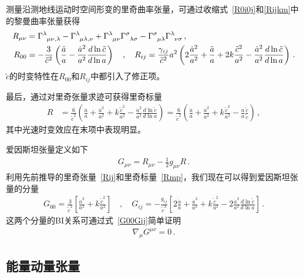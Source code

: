 \documentclass[jkps,preprint,fleqn]{revtex4}
\newcommand{\tc}{\tilde{c}}
\begin{document}
\begin{CJK*}{UTF8}{gbsn}
测量沿测地线运动时空间形变的里奇曲率张量，可通过收缩式~\eqref{R0i0j}和\eqref{Rijkm}中的黎曼曲率张量获得
\begin{align}
R_{\mu\nu} &= \tensor{\Gamma}{^\lambda_\mu_\nu_,_\lambda} - \tensor{\Gamma}{^\lambda_\mu_\lambda_,_\nu} + \tensor{\Gamma}{^\lambda_\mu_\nu} \tensor{\Gamma}{^\sigma_\lambda_\sigma} - \tensor{\Gamma}{^\sigma_\mu_\lambda} \tensor{\Gamma}{^\lambda_\nu_\sigma} \label{Rmn} \,, \\ R_{00} &= -\frac{3}{\tc^2} \left( \frac{\ddot{a}}{a} - \frac{\dot{a}^2}{a^2} \frac{d \ln \tc}{ d \ln a}  \right) \quad , \quad R_{ij} = \frac{\gamma_{ij}}{\tc^2} a^2 \left( 2 \frac{\dot{a}^2}{a^2} + \frac{\ddot{a}}{a} + 2 k \frac{\tc^2}{a^2} - \frac{\dot{a}^2}{a^2} \frac{d \ln \tc}{ d \ln a}  \right) \label{Rij} \,. \end{align}
$\tc$的时变特性在$R_{00}$和$R_{ij}$中都引入了修正项。

最后，通过对里奇张量求迹可获得里奇标量
\begin{align} R &= \frac{6}{\tc^2} \left( \frac{\ddot{a}}{a} + \frac{\dot{a}^2}{a^2} + k \frac{\tc^2}{a^2} - \frac{\dot{a}^2}{a^2} \frac{d \ln \tc}{ d \ln a}  \right) =  \frac{6}{\tc^2} \left( \frac{\ddot{a}}{a} + \frac{\dot{a}^2}{a^2} + k \frac{\tc^2}{a^2} - \frac{\dot{a}}{a} \frac{\dot{\tc}}{\tc}  \right)  \label{Rmp} \,, \end{align}
其中光速时变效应在末项中表现明显。

爱因斯坦张量定义如下
\begin{align}
G_{\mu\nu} = R_{\mu\nu} - \frac{1}{2} g_{\mu\nu} R \label{Gmunu} \,.
\end{align}
利用先前推导的里奇张量~\eqref{Rij}和里奇标量~\eqref{Rmp}，我们现在可以得到爱因斯坦张量的分量
\begin{align}
G_{00} = \frac{3}{\tc^2} \left[ \frac{\dot{a}^2}{a^2} + k \frac{\tc^2}{a^2} \right] \quad , \quad G_{ij} = -\frac{g_{ij}}{\tc^2} \left[ 2 \frac{\ddot{a}}{a} + \frac{\dot{a}^2}{a^2} + k \frac{\tc^2}{a^2} - 2 \frac{\dot{a}^2}{a^2} \frac{d \ln \tc}{d \ln a} \right] \,. \label{G00Gij}
\end{align}
这两个分量的BI关系可通过式~\eqref{G00Gij}简单证明
\begin{align}
\nabla_{\mu} G^{\mu \nu} = 0 \label{nablaGmunu} \,.
\end{align}
\subsection{能量动量张量}\label{subsec:Tmunu}


\end{CJK*}
\end{document}
